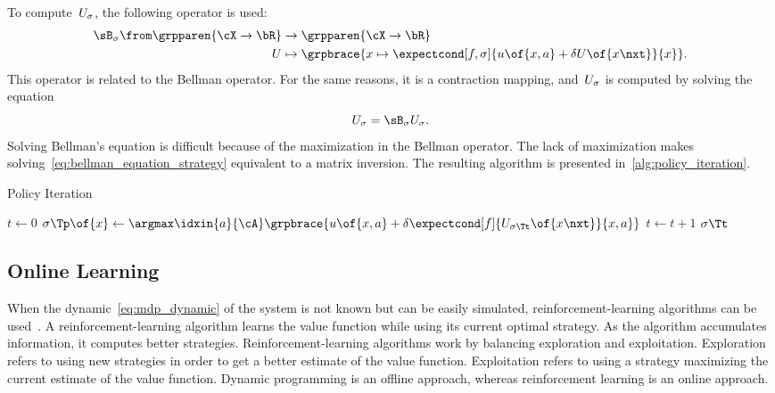 To compute~\(U_{\sigma}\), the following operator is used:
\[
\begin{aligned}
\sB\strat{\sigma} \from \grpparen{\cX \to \bR} &\to \grpparen{\cX \to \bR} \\
U &\mapsto \grpbrace{x \mapsto \expectcond[f, \sigma]{u \of{x, a} + \delta U \of{x\nxt}}{x}}.
\end{aligned}
\]
This operator is related to the Bellman operator.
For the same reasons, it is a contraction mapping, and~\(U_{\sigma}\) is computed by solving the equation
\begin{equation}
\label{eq:bellman_equation_strategy}
U\strat{\sigma} = \sB\strat{\sigma} U\strat{\sigma}.
\end{equation}
Solving Bellman's equation is difficult because of the maximization in the Bellman operator.
The lack of maximization makes solving~\cref{eq:bellman_equation_strategy} equivalent to a matrix inversion.
The resulting algorithm is presented in~\cref{alg:policy_iteration}.

\begin{algorithm}[pht]
  \caption{Policy Iteration}
  \label{alg:policy_iteration}
  \begin{algorithmic}
      \State \(t \gets 0\)
      \Repeat
          \State \(\sigma\Tp \of {x} \gets \argmax\idxin{a}{\cA} \grpbrace{ u\of{x,a} + \delta \expectcond[f]{U\strat{\sigma\Tt} \of{x\nxt}}{x,a}}\)
        \EndFor
        \State \(t \gets t+1\)
      \Until{\(\sigma\Tt = \sigma\Tm\)}
      \State \Return \(\sigma\Tt\)
    \EndProcedure
  \end{algorithmic}
\end{algorithm}

\subsection{Online Learning}
When the dynamic~\cref{eq:mdp_dynamic} of the system is not known but can be easily simulated, reinforcement-learning algorithms can be used~\cite{bertsekas_tsitsiklis:1996, sutton_barto:1998}.
A reinforcement-learning algorithm learns the value function while using its current optimal strategy.
As the algorithm accumulates information, it computes better strategies.
Reinforcement-learning algorithms work by balancing exploration and exploitation.
Exploration refers to using new strategies in order to get a better estimate of the value function.
Exploitation refers to using a strategy maximizing the current estimate of the value function.
Dynamic programming is an offline approach, whereas reinforcement learning is an online approach.

